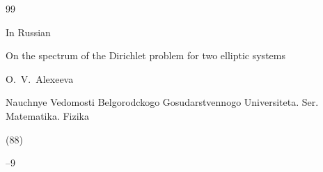 \begin{thebibliography}{99}

\misctransl

\lang In Russian

\paper On the spectrum of the Dirichlet problem for two elliptic systems

\by O.~V.~Alexeeva

\jour Nauchnye Vedomosti Belgorodckogo Gosudarstvennogo Universiteta. Ser. Matematika. Fizika


(88)


--9





\end{thebibliography}










\makeentitle

%

%



\newpage

%



%

%

%

%

